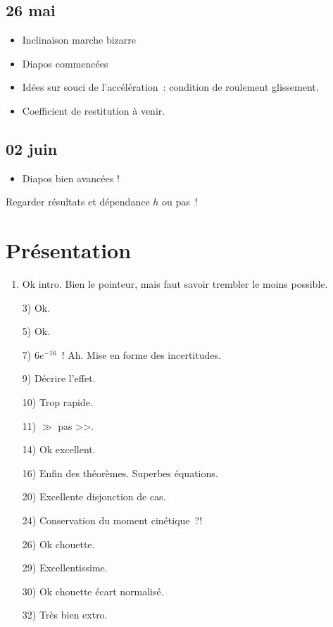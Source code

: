 \documentclass[a4paper, 11pt, final, garamond]{book}
\begin{document}
\subsection{26 mai}
\begin{itemize}
  \item Inclinaison marche bizarre
  \item Diapos commencées
  \item Idées sur souci de l'accélération~: condition de roulement glissement.
  \item Coefficient de restitution à venir.
\end{itemize}

\subsection{02 juin}
\begin{itemize}
  \item Diapos bien avancées !
\end{itemize}

\begin{center}
  \huge Regarder résultats et dépendance $h$ ou pas~!
\end{center}

\section{Présentation}

\begin{enumerate}
  \item Ok intro. Bien le pointeur, mais faut savoir trembler le moins possible.
  \item[3)] Ok.
  \item[5)] Ok.
  \item[7)] $6e^{-16}$~! Ah. Mise en forme des incertitudes.
  \item[9)] Décrire l'effet.
  \item[10)] Trop rapide.
  \item[11)] $\gg$ pas >>.
  \item[14)] Ok excellent.
  \item[16)] Enfin des théorèmes. Superbes équations.
  \item[20)] Excellente disjonction de cas.
  \item[24)] Conservation du moment cinétique~?!
  \item[26)] Ok chouette.
  \item[29)] Excellentissime.
  \item[30)] Ok chouette écart normalisé.
  \item[32)] Très bien extro.
\end{enumerate}
\end{document}
